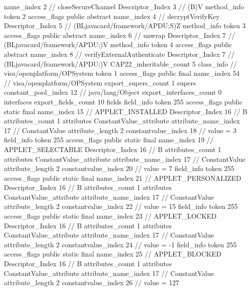 {{{{{					name_index	2		// closeSecureChannel
					Descriptor_Index	3		// (B)V
				}
				method_info {
					token	2
					access_flags	public abstract
					name_index	4		// decryptVerifyKey
					Descriptor_Index	5		// (BLjavacard/framework/APDU;S)Z
				}
				method_info {
					token	3
					access_flags	public abstract
					name_index	6		// unwrap
					Descriptor_Index	7		// (BLjavacard/framework/APDU;)V
				}
				method_info {
					token	4
					access_flags	public abstract
					name_index	8		// verifyExternalAuthenticate
					Descriptor_Index	7		// (BLjavacard/framework/APDU;)V
				}
			}
			CAP22_inheritable_count	5
		}
		class_info {		// visa/openplatform/OPSystem
			token	1
			access_flags	public final
			name_index	54		// visa/openplatform/OPSystem
			export_supers_count	1
			supers {
				constant_pool_index	12		// java/lang/Object
			}
			export_interfaces_count	0
			interfaces {
			}
			export_fields_count	10
			fields {
			field_info {
				token	255
				access_flags	public static final
				name_index	15		// APPLET_INSTALLED
				Descriptor_Index	16		// B
				attributes_count	1
				attributes {
				ConstantValue_attribute {
					attribute_name_index	17		// ConstantValue
					attribute_length	2
					constantvalue_index	18		// value = 3
				}
				}
			}
			field_info {
				token	255
				access_flags	public static final
				name_index	19		// APPLET_SELECTABLE
				Descriptor_Index	16		// B
				attributes_count	1
				attributes {
				ConstantValue_attribute {
					attribute_name_index	17		// ConstantValue
					attribute_length	2
					constantvalue_index	20		// value = 7
				}
				}
			}
			field_info {
				token	255
				access_flags	public static final
				name_index	21		// APPLET_PERSONALIZED
				Descriptor_Index	16		// B
				attributes_count	1
				attributes {
				ConstantValue_attribute {
					attribute_name_index	17		// ConstantValue
					attribute_length	2
					constantvalue_index	22		// value = 15
				}
				}
			}
			field_info {
				token	255
				access_flags	public static final
				name_index	23		// APPLET_LOCKED
				Descriptor_Index	16		// B
				attributes_count	1
				attributes {
				ConstantValue_attribute {
					attribute_name_index	17		// ConstantValue
					attribute_length	2
					constantvalue_index	24		// value = -1
				}
				}
			}
			field_info {
				token	255
				access_flags	public static final
				name_index	25		// APPLET_BLOCKED
				Descriptor_Index	16		// B
				attributes_count	1
				attributes {
				ConstantValue_attribute {
					attribute_name_index	17		// ConstantValue
					attribute_length	2
					constantvalue_index	26		// value = 127
}}}}}}}
